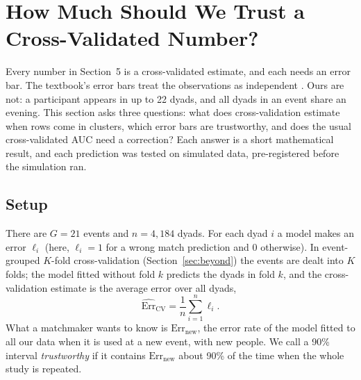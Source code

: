 
\section{How Much Should We Trust a Cross-Validated Number?}
\label{sec:errorbars}

Every number in Section~5 is a cross-validated estimate, and each needs an error bar. The textbook's error bars treat
the observations as independent \cite[Section 5.1.3, pp.~206--208]{James:2023}. Ours are not: a participant appears in up
to 22 dyads, and all dyads in an event share an evening. This section asks three questions: what does
cross-validation estimate when rows come in clusters, which error bars are trustworthy, and does the usual
cross-validated AUC need a correction? Each answer is a short mathematical result, and each prediction was tested on
simulated data, pre-registered before the simulation ran.

\subsection{Setup}

There are $G=21$ events and $n=4{,}184$ dyads. For each dyad $i$ a model makes an error $\ell_i$ (here, $\ell_i=1$ for a wrong
match prediction and 0 otherwise). In event-grouped $K$-fold cross-validation (Section~\ref{sec:beyond}) the events are
dealt into $K$ folds; the model fitted without fold $k$ predicts the dyads in fold $k$, and the cross-validation estimate
is the average error over all dyads,
\[
\widehat{\mathrm{Err}}_{\mathrm{CV}}=\frac1n\sum_{i=1}^n\ell_i .
\]
What a matchmaker wants to know is $\mathrm{Err}_{\mathrm{new}}$, the error rate of the model fitted to all our data when it is
used at a new event, with new people. We call a 90\% interval \emph{trustworthy} if it contains $\mathrm{Err}_{\mathrm{new}}$ about
90\% of the time when the whole study is repeated.

